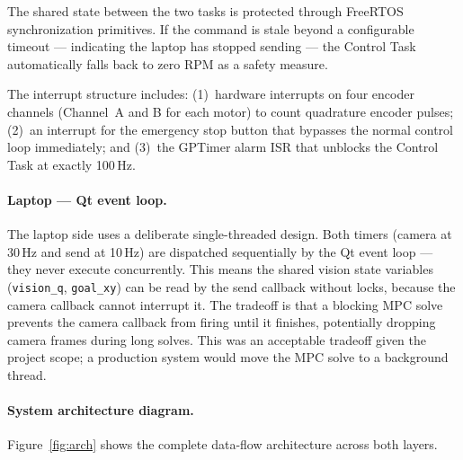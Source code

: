 \documentclass[11pt, letterpaper]{article}
\begin{document}
The shared state between the two tasks is protected through FreeRTOS
synchronization primitives. If the command is stale beyond a
configurable timeout --- indicating the laptop has stopped sending --- the
Control Task automatically falls back to zero RPM as a safety measure.

The interrupt structure includes: (1)~hardware interrupts on four
encoder channels (Channel~A and B for each motor) to count quadrature
encoder pulses; (2)~an interrupt for the emergency stop button that
bypasses the normal control loop immediately; and (3)~the GPTimer alarm
ISR that unblocks the Control Task at exactly 100\,Hz.

\paragraph{Laptop --- Qt event loop.}
The laptop side uses a deliberate single-threaded design. Both timers
(camera at 30\,Hz and send at 10\,Hz) are dispatched sequentially by
the Qt event loop --- they never execute concurrently. This means the
shared vision state variables (\texttt{vision\_q}, \texttt{goal\_xy})
can be read by the send callback without locks, because the camera
callback cannot interrupt it. The tradeoff is that a blocking MPC solve
prevents the camera callback from firing until it finishes, potentially
dropping camera frames during long solves. This was an acceptable
tradeoff given the project scope; a production system would move the MPC
solve to a background thread.

\paragraph{System architecture diagram.}
Figure~\ref{fig:arch} shows the complete data-flow architecture across
both layers.
\end{document}
